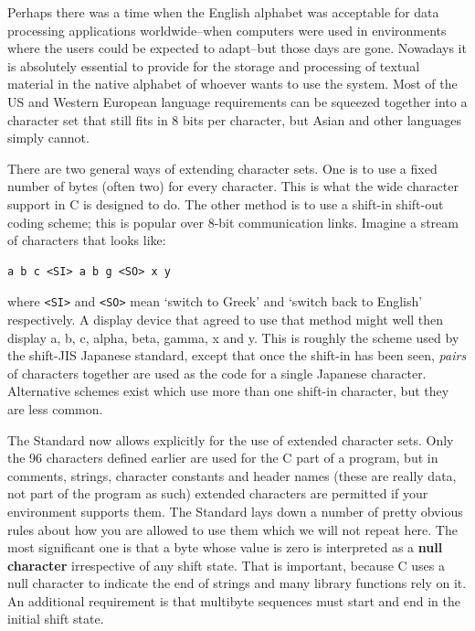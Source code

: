    Perhaps there was a time when the English alphabet was acceptable for
    data processing applications worldwide--when computers were used in
    environments where the users could be expected to adapt--but those
    days are gone. Nowadays it is absolutely essential to provide for the
    storage and processing of textual material in the native alphabet of
    whoever wants to use the system. Most of the US and Western European
    language requirements can be squeezed together into a character set that
    still fits in 8 bits per character, but Asian and other languages
    simply cannot.


   There are two general ways of extending character sets. One is to use a
    fixed number of bytes (often two) for every character. This is what the
    wide character support in C is designed to do. The other method is to use
    a shift-in shift-out coding scheme; this is popular over 8-bit
    communication links. Imagine a stream of characters that looks like:


   \begin{Verbatim}
a b c <SI> a b g <SO> x y
\end{Verbatim}

   where \texttt{<SI>} and \texttt{<SO>} mean
    `switch to Greek' and `switch back to English'
    respectively. A display device that agreed to use that method might well
    then display a, b, c, alpha, beta, gamma, x and y. This is roughly the
    scheme used by the shift-JIS Japanese standard, except that once the
    shift-in has been seen, \textit{pairs} of characters together are used as
    the code for a single Japanese character. Alternative schemes exist which
    use more than one shift-in character, but they are less common.


   The Standard now allows explicitly for the use of extended character
    sets. Only the 96 characters defined earlier are used for the C part
    of a program, but in comments, strings, character constants and header
    names (these are really data, not part of the program as such) extended
    characters are permitted if your environment supports them. The Standard
    lays down a number of pretty obvious rules about how you are allowed to
    use them which we will not repeat here. The most significant one is that a
    byte whose value is zero is interpreted as a \textbf{null character}
    irrespective of any shift state. That is important, because C uses a null
    character to indicate the end of strings and many library functions rely
    on it. An additional requirement is that multibyte sequences must start
    and end in the initial shift state.


